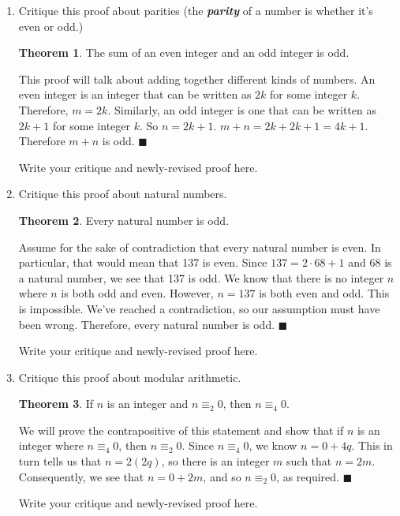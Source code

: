 \documentclass{article}
\renewcommand{\(}{\left(}
\renewcommand{\)}{\right)}
\renewcommand\qedsymbol{$\blacksquare$}
\newenvironment{prf}{{\bfseries Proof.}}{\qedsymbol}
\theoremstyle{plain}
\theoremstyle{plain}
\theoremstyle{definition}
\newtheorem*{thm}{Theorem}
\begin{document}
\begin{enumerate}[label*=\roman*.,ref=\roman*]
    \item Critique this proof about parities (the \textit{\textbf{parity}} of a number is whether it's even or odd.)
    \begin{thm}
     The sum of an even integer and an odd integer is odd.
    \end{thm}
    \begin{prf}
    This proof will talk about adding together different kinds of numbers. An even integer is an integer that can be written as $2k$ for some integer $k$. Therefore, $m = 2k$. Similarly, an odd integer is one that can be written as $2k+1$ for some integer $k$. So $n = 2k+1$. $m + n = 2k + 2k + 1 = 4k + 1$. Therefore $m + n$ is odd.
    \end{prf}
    
    \begin{shaded}
    Write your critique and newly-revised proof here.
    \end{shaded}

    \item Critique this proof about natural numbers.
    \begin{thm}
    Every natural number is odd.
    \end{thm}
    \begin{prf}
    Assume for the sake of contradiction that every natural number is even. In particular, that would mean that 137 is even. Since $137 = 2 \cdot 68 + 1$ and 68 is a natural number, we see that 137 is odd. We know that there is no integer $n$ where $n$ is both odd and even. However, $n = 137$ is both even and odd. This is impossible. We've reached a contradiction, so our assumption must have been wrong. Therefore, every natural number is odd.
    \end{prf}
    
    \begin{shaded}
    Write your critique and newly-revised proof here.
    \end{shaded}

    \item Critique this proof about modular arithmetic. 
    \begin{thm}
     If $n$ is an integer and $n \equiv_2 0$, then $n \equiv_4 0$.
    \end{thm}
    \begin{prf}
    We will prove the contrapositive of this statement and show that if $n$ is an integer where $n \equiv_4 0$, then $n \equiv_2 0$. Since $n \equiv_4 0$, we know $n = 0 + 4q$. This in turn tells us that $n = 2(2q)$, so there is an integer $m$ such that $n = 2m$. Consequently, we see that $n = 0 + 2m$, and so $n \equiv_2 0$, as required.
    \end{prf}

    \begin{shaded}
    Write your critique and newly-revised proof here.
    \end{shaded}

\end{enumerate}
\end{document}

